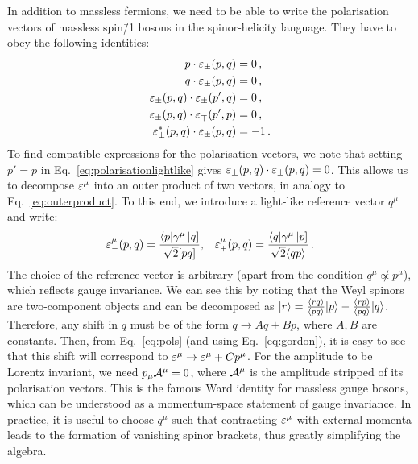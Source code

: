 \documentclass[main.tex]{subfiles}
\begin{document}
In addition to massless fermions, we need to be able to write the polarisation vectors of massless spin\=/1 bosons in the spinor-helicity language. They have to obey the following identities:
\begin{subequations}
    \begin{align}
        p \cdot \varepsilon_\pm(p, q) &= 0\,, \\
        q \cdot \varepsilon_\pm(p, q) &= 0\,, \\
        \varepsilon_\pm (p, q) \cdot \varepsilon_\pm(p', q) &= 0\,, \label{eq:polarisationlightlike} \\
        \varepsilon_\pm (p, q) \cdot \varepsilon_\mp(p', p) &= 0\,, \\
        \varepsilon_\pm^\ast (p, q) \cdot \varepsilon_\pm(p, q) &= -1\,.
    \end{align}
\end{subequations}
To find compatible expressions for the polarisation vectors, we note that setting $p' = p$ in Eq.~\ref{eq:polarisationlightlike} gives $\varepsilon_{\pm}(p, q) \cdot \varepsilon_{\pm}(p, q) = 0$. This allows us to decompose $\varepsilon^\mu$ into an outer product of two vectors, in analogy to Eq.~\ref{eq:outerproduct}. To this end, we introduce a light-like reference vector $q^\mu$ and write:
\begin{align} \label{eq:pols}
    \varepsilon^\mu_{-}(p, q) = \frac{\langle p|\gamma^\mu\left| q \right]}{\sqrt{2}[ pq ]}, && \varepsilon^\mu_{+}(p, q) = \frac{\langle q|\gamma^\mu\left| p \right]}{\sqrt{2}\langle qp \rangle} \,.
\end{align}
The choice of the reference vector is arbitrary (apart from the condition $q^\mu \not\propto p^\mu$), which reflects gauge invariance. We can see this by noting that the Weyl spinors are two-component objects and can be decomposed as $|r \rangle = \frac{\langle rq \rangle}{\langle pq \rangle}|p \rangle - \frac{\langle rp \rangle}{\langle pq \rangle}|q \rangle$. Therefore, any shift in $q$ must be of the form $q \rightarrow Aq + Bp$, where $A, B$ are constants. Then, from Eq.~\ref{eq:pols} (and using Eq.~\ref{eq:gordon}), it is easy to see that this shift will correspond to $\varepsilon^\mu \rightarrow \varepsilon^\mu + Cp^\mu$. For the amplitude to be Lorentz invariant, we need $p_\mu \mathcal{A}_{}^{\mu}=0$, where
$\mathcal{A}_{}^{\mu}$ is the amplitude stripped of its polarisation vectors. This is the famous Ward identity for massless gauge bosons, which can be understood as a momentum-space statement of gauge invariance.
In practice, it is useful to choose $q^\mu$ such that contracting $\varepsilon^\mu$ with external momenta leads to the formation of vanishing spinor brackets, thus greatly simplifying the algebra.
\end{document}
